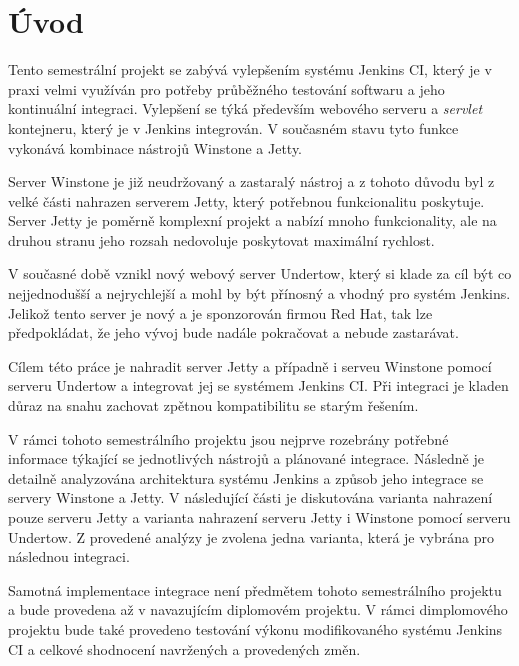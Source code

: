 



\chapter{Úvod}
    Tento semestrální projekt se zabývá vylepšením systému Jenkins CI, který je v praxi velmi využíván pro potřeby průběžného testování softwaru
    a jeho kontinuální integraci. Vylepšení se týká především webového serveru a \emph{servlet} kontejneru, který je v Jenkins integrován. 
    V současném stavu tyto funkce vykonává kombinace nástrojů Winstone a Jetty. 
    
    Server Winstone je již neudržovaný a zastaralý nástroj a z tohoto důvodu
    byl z velké části nahrazen serverem Jetty, který potřebnou funkcionalitu poskytuje. Server Jetty je poměrně komplexní projekt a nabízí
    mnoho funkcionality, ale na druhou stranu jeho rozsah nedovoluje poskytovat maximální rychlost.
    
    V současné době vznikl nový webový server Undertow, který si klade za cíl být co nejjednodušší a nejrychlejší a mohl by být přínosný
    a vhodný pro systém Jenkins. Jelikož tento server je nový a je sponzorován firmou Red Hat, tak lze předpokládat, že jeho vývoj
    bude nadále pokračovat a nebude zastarávat.

    Cílem této práce je nahradit server Jetty a případně i serveu Winstone pomocí serveru Undertow 
    a integrovat jej se systémem Jenkins CI. Při integraci je kladen důraz na snahu
    zachovat zpětnou kompatibilitu se starým řešením. 

    V rámci tohoto semestrálního projektu jsou nejprve rozebrány potřebné informace týkající se jednotlivých nástrojů a plánované integrace.
    Následně je detailně analyzována architektura systému Jenkins a způsob jeho integrace se servery Winstone a Jetty. V následující části
    je diskutována varianta nahrazení pouze serveru Jetty a varianta nahrazení serveru Jetty i Winstone pomocí serveru Undertow. 
    Z provedené analýzy je zvolena jedna varianta, která je vybrána pro následnou integraci.

    Samotná implementace integrace není předmětem tohoto semestrálního projektu a bude provedena až v navazujícím diplomovém projektu. 
    V rámci dimplomového projektu bude také provedeno testování výkonu modifikovaného systému Jenkins CI a celkové shodnocení navržených
    a provedených změn.



